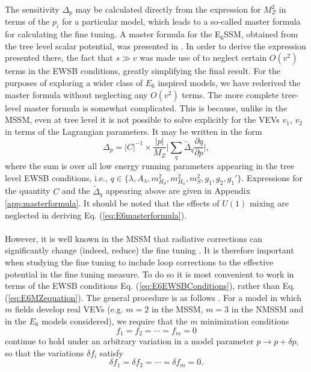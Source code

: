 \documentclass[preprint,amsmath,amssymb,aps,superscriptaddress,prd,showpacs,floatfix,nofootinbib]{revtex4-1}
\newcommand{\be}{\begin{equation}}
\newcommand{\ee}{\end{equation}}
\begin{document}
The sensitivity $\Delta_p$ may be calculated directly
from the expression for $M_Z^2$ in terms of the $p_i$ for a particular
model, which leads to a so-called master formula for calculating the
fine tuning. A master formula for the E$_6$SSM, obtained from the tree
level scalar potential, was presented in \cite{Athron:2013ipa}. In
order to derive the expression presented there, the fact that $s \gg
v$ was made use of to neglect certain $O(v^2)$ terms in the EWSB
conditions, greatly simplifying the final result. For the purposes of
exploring a wider class of $E_6$ inspired models, we have rederived
the master formula without neglecting any $O(v^2)$ terms. The more
complete tree-level master formula is somewhat complicated. This is
because, unlike in the MSSM, even at tree level it is not possible to
solve explicitly for the VEVs $v_1$, $v_2$ in terms of the Lagrangian
parameters. It may be written in the form \be \Delta_p=|C|^{-1}\times
\frac{|p|}{M_Z}\bigg|\sum_{q}\tilde{\Delta}_q\frac{\partial
  q}{\partial p}\bigg|,
\label{eq:E6masterformula}
\ee where the sum is over all low energy running parameters appearing
in the tree level EWSB conditions, i.e., $q\in\{\lambda, A_\lambda,
m_{H_d}^2,m_{H_u}^2,m_S^2,g_1,g_2,g_1'\}$. Expressions for the
quantity $C$ and the $\tilde{\Delta}_q$ appearing above are given in
Appendix \ref{app:masterformula}. It should be noted that the effects
of $U(1)$ mixing are neglected in deriving
Eq. (\ref{eq:E6masterformula}).\\ \\ However, it is well known in the
MSSM that radiative corrections can significantly change (indeed,
reduce) the fine tuning \cite{Cassel:2010px}. It is therefore
important when studying the fine tuning to include loop corrections to
the effective potential in the fine tuning measure. To do so it is
most convenient to work in terms of the EWSB conditions
Eq. (\ref{eq:E6EWSBConditions}), rather than
Eq. (\ref{eq:E6MZequation}). The general procedure is as follows
\cite{Ellwanger:2011mu}. For a model in which $m$ fields develop real
VEVs (e.g. $m=2$ in the MSSM, $m=3$ in the NMSSM and in the $E_6$
models considered), we require that the $m$ minimization conditions
\begin{equation}\label{eq:EWSBconditions}
f_1=f_2=\dotsb=f_m=0
\end{equation}
continue to hold under an arbitrary variation in a model parameter
$p\rightarrow p+\delta p$, so that the variations $\delta f_i$ satisfy
\begin{equation}\label{eq:EWSBvariations}
\delta f_1 = \delta f_2=\dotsb =\delta f_m =0.
\end{equation}
\end{document}
